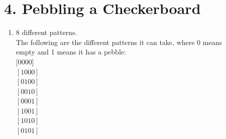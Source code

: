 \documentclass[11pt]{article}
\newenvironment{qparts}{\begin{enumerate}[{(}a{)}]}{\end{enumerate}}
\begin{document}
\section*{4. Pebbling a Checkerboard}
\begin{qparts}
\item 8 different patterns. \\

The following are the different patterns it can take, where 0 means\\
 empty and 1 means it has a pebble: \\
$[0 0 0 0$] \\
$[1 0 0 0]$ \\
$[0 1 0 0]$ \\
$[0 0 1 0]$ \\
$[0 0 0 1]$ \\
$[1 0 0 1]$ \\
$[1 0 1 0]$ \\
$[0 1 0 1]$


\end{qparts}
\end{document}

